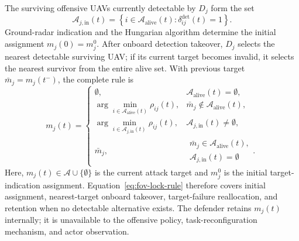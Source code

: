 \documentclass{cja}
\begin{document}
The surviving offensive UAVs currently detectable by $D_j$ form the set
\begin{equation}
\mathcal A_{j,\mathrm{in}}(t)
=
\left\{
i\in\mathcal A_{\mathrm{alive}}(t):
\delta_{ij}^{\mathrm{det}}(t)=1
\right\}.
\label{eq:in-detect-set}
\end{equation}
Ground-radar indication and the Hungarian algorithm determine the initial assignment $m_j(0)=m_j^0$. After onboard detection takeover, $D_j$ selects the nearest detectable surviving UAV; if its current target becomes invalid, it selects the nearest survivor from the entire alive set. With previous target $\bar m_j=m_j(t^-)$, the complete rule is
\begin{equation}
m_j(t)=
\begin{cases}
\emptyset,
& \mathcal A_{\mathrm{alive}}(t)=\emptyset,\\[1mm]
\displaystyle \arg\min_{i\in \mathcal A_{\mathrm{alive}}(t)}
\rho_{ij}(t),
& \bar m_j\notin \mathcal A_{\mathrm{alive}}(t),\\[3mm]
\displaystyle \arg\min_{i\in \mathcal A_{j,\mathrm{in}}(t)}
\rho_{ij}(t),
& \mathcal A_{j,\mathrm{in}}(t)\neq\emptyset,\\[3mm]
\bar m_j,
& \substack{\bar m_j\in \mathcal A_{\mathrm{alive}}(t),\\
\mathcal A_{j,\mathrm{in}}(t)=\emptyset}.
\end{cases}
\label{eq:fov-lock-rule}
\end{equation}
Here, $m_j(t)\in\mathcal A\cup\{\emptyset\}$ is the current attack target and $m_j^0$ is the initial target-indication assignment. Equation~\eqref{eq:fov-lock-rule} therefore covers initial assignment, nearest-target onboard takeover, target-failure reallocation, and retention when no detectable alternative exists. The defender retains $m_j(t)$ internally; it is unavailable to the offensive policy, task-reconfiguration mechanism, and actor observation.
\end{document}
